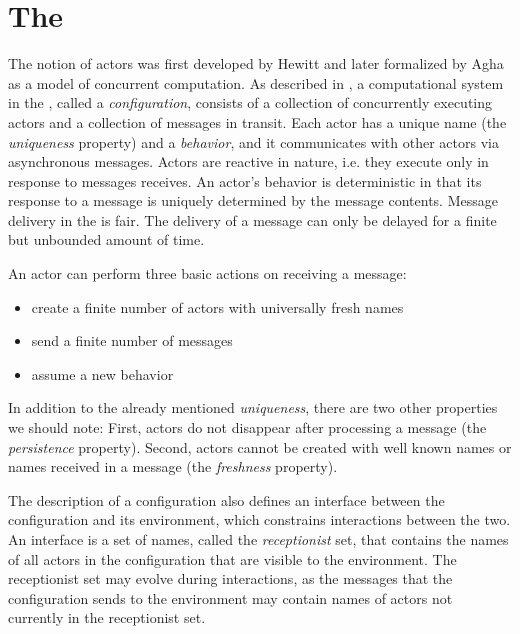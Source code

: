 \section{The \ActorModel}

The notion of actors was first developed by Hewitt \cite{hewitt_universal_1973}
and later formalized by Agha \cite{agha_actors:_1986}
as a model of concurrent computation.
As described in \cite{agha_algebraic_2004},
a computational system in the \actormodel, called a \emph{configuration},
consists of a collection of concurrently executing actors
and a collection of messages in transit.
Each actor has a unique name (the \emph{uniqueness} property)
and a \emph{behavior},
and it communicates with other actors via asynchronous messages.
Actors are reactive in nature,
i.e. they execute only in response to messages receives.
An actor's behavior is deterministic in that its response to a message is
uniquely determined by the message contents.
Message delivery in the \actormodel is fair.
The delivery of a message can only be delayed
for a finite but unbounded amount of time.

An actor can perform three basic actions on receiving a message:
\begin{itemize}
  \item create a finite number of actors with universally fresh names
  \item send a finite number of messages
  \item assume a new behavior
\end{itemize}

In addition to the already mentioned \emph{uniqueness},
there are two other properties we should note:
First, actors do not disappear after processing a message
(the \emph{persistence} property).
Second,
actors cannot be created with well known names or names received in a message
(the \emph{freshness} property).

The description of a configuration also defines an interface
between the configuration and its environment,
which constrains interactions between the two.
An interface is a set of names, called the \emph{receptionist} set,
that contains the names of all actors in the configuration
that are visible to the environment.
The receptionist set may evolve during interactions,
as the messages that the configuration sends to the environment
may contain names of actors not currently in the receptionist set.


\subsection{\ActorPiCalc}

